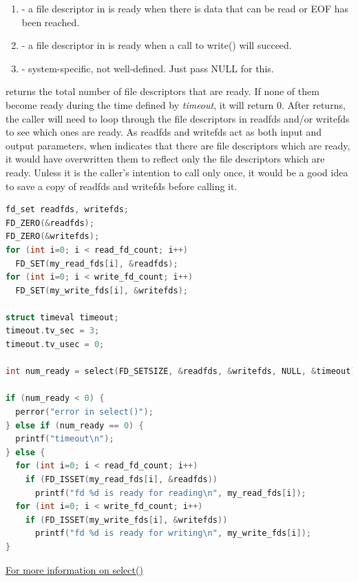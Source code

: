 \begin{enumerate}
\item {} - a file descriptor in  is ready when there is data that can be read or EOF has been reached.

\item {} - a file descriptor in  is ready when a call to write() will succeed.

\item {} - system-specific, not well-defined.
  Just pass NULL for this.
\end{enumerate}

 returns the total number of file descriptors that are ready.
If none of them become ready during the time defined by \emph{timeout}, it will return 0.
After  returns, the caller will need to loop through the file descriptors in readfds and/or writefds to see which ones are ready.
As readfds and writefds act as both input and output parameters, when  indicates that there are file descriptors which are ready, it would have overwritten them to reflect only the file descriptors which are ready.
Unless it is the caller's intention to call  only once, it would be a good idea to save a copy of readfds and writefds before calling it.

\begin{lstlisting}[language=C]
fd_set readfds, writefds;
FD_ZERO(&readfds);
FD_ZERO(&writefds);
for (int i=0; i < read_fd_count; i++)
  FD_SET(my_read_fds[i], &readfds);
for (int i=0; i < write_fd_count; i++)
  FD_SET(my_write_fds[i], &writefds);

struct timeval timeout;
timeout.tv_sec = 3;
timeout.tv_usec = 0;

int num_ready = select(FD_SETSIZE, &readfds, &writefds, NULL, &timeout);

if (num_ready < 0) {
  perror("error in select()");
} else if (num_ready == 0) {
  printf("timeout\n");
} else {
  for (int i=0; i < read_fd_count; i++)
    if (FD_ISSET(my_read_fds[i], &readfds))
      printf("fd %d is ready for reading\n", my_read_fds[i]);
  for (int i=0; i < write_fd_count; i++)
    if (FD_ISSET(my_write_fds[i], &writefds))
      printf("fd %d is ready for writing\n", my_write_fds[i]);
}
\end{lstlisting}

\href{http://pubs.opengroup.org/onlinepubs/9699919799/functions/select.html}{For more information on select()}

